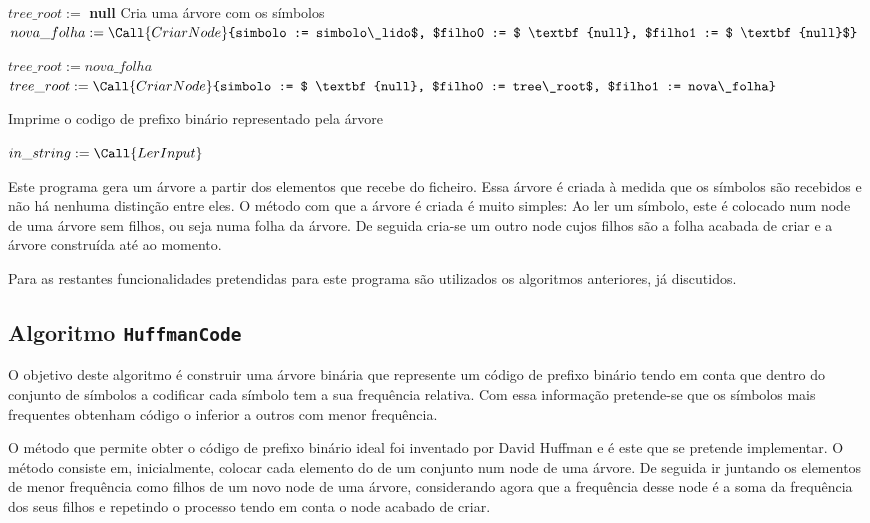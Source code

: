 \documentclass{article}
\begin{document}
\begin{algorithm}[H]
\caption{}
\label{al:decode}
\begin{algorithmic}
	\State $tree\_root := $ \textbf{null}
	 \Comment Cria uma árvore com os símbolos
		\State $nova\_folha := \Call{CriarNode}{simbolo := simbolo\_lido$, $filho0 := $ \textbf{null}, $filho1 := $ \textbf{null}$}$
		
			\State $tree\_root := nova\_folha$
		\Else
			\State $tree\_root := \Call{CriarNode}{simbolo := $ \textbf{null}, $filho0 := tree\_root$, $filho1 := nova\_folha}$
		\EndIf
	\EndWhile
	
	\State {} \Comment Imprime o codigo de prefixo binário representado pela árvore

	
	\State $in\_string := \Call{LerInput}$
	\State {}
	\State {}

\EndProcedure
\end{algorithmic}
\end{algorithm}

Este programa gera um árvore a partir dos elementos que recebe do ficheiro. Essa árvore é criada à medida que os símbolos são recebidos e não há nenhuma distinção entre eles. O método com que a árvore é criada é muito simples: Ao ler um símbolo, este é colocado num node de uma árvore sem filhos, ou seja numa folha da árvore. De seguida cria-se um outro node cujos filhos são a folha acabada de criar e a árvore construída até ao momento. 

Para as restantes funcionalidades pretendidas para este programa são utilizados os algoritmos anteriores, já discutidos.


\subsection{Algoritmo \texttt{HuffmanCode}}

O objetivo deste algoritmo é construir uma árvore binária que represente um código de prefixo binário tendo em conta que dentro do conjunto de símbolos a codificar cada símbolo tem a sua frequência relativa. Com essa informação pretende-se que os símbolos mais frequentes obtenham código o inferior a outros com menor frequência.

O método que permite obter o código de prefixo binário ideal foi inventado por David Huffman e é este que se pretende implementar. O método consiste em, inicialmente, colocar cada elemento do de um conjunto num node de uma árvore. De seguida ir juntando os elementos de menor frequência como filhos de um novo node de uma árvore, considerando agora que a frequência desse node é a soma da frequência dos seus filhos e repetindo o processo tendo em conta o node acabado de criar.
\end{document}
